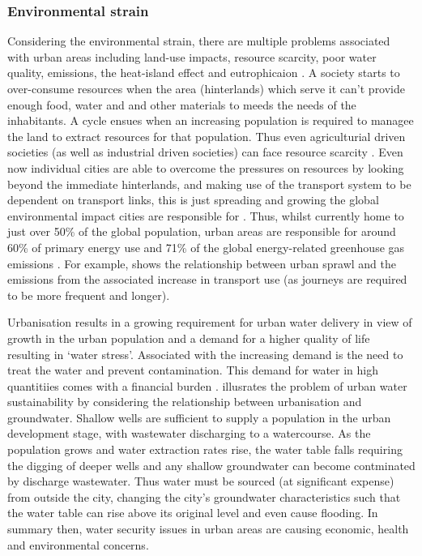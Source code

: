 \subsubsection{Environmental strain}
Considering the environmental strain, there are multiple problems associated with urban areas including land-use impacts, resource scarcity, poor water quality, emissions, the heat-island effect and eutrophicaion \citep{Cai2011}. A society starts to over-consume resources when the area (hinterlands) which serve it can't provide enough food, water and and other materials to meeds the needs of the inhabitants. A cycle ensues when an increasing population is required to managee the land to extract resources for that population. Thus even agriculturial driven societies (as well as industrial driven societies) can face resource scarcity \citep{Haberl2001a, Haberl2001b, Gr2003}. Even now individual cities are able to overcome the pressures on resources by looking beyond the immediate hinterlands, and making use of the transport system to be dependent on transport links, this is just spreading and growing the global environmental impact cities are responsible for \citep{Agudelo-Vera2011}. Thus, whilst currently home to just over 50\% of the global population, urban areas are responsible for around 60\% of primary energy use and 71\% of the global energy-related greenhouse gas emissions \citep{IEA2008}. For example, \citet{Grubler2009} shows the relationship between urban sprawl and the emissions from the associated increase in transport use (as journeys are required to be more frequent and longer).

Urbanisation results in a growing requirement for urban water delivery in view of growth in the urban population and a demand for a higher quality of life resulting in `water stress'. Associated with the increasing demand is the need to treat the water and prevent contamination. This demand for water in high quantitiies comes with a financial burden \citep{Diagger2009}. \citet{Kennedy} illusrates the problem of urban water sustainability by considering the relationship between urbanisation and groundwater. Shallow wells are sufficient to supply a population in the urban development stage, with wastewater discharging to a watercourse. As the population grows and water extraction rates rise, the water table falls requiring the digging of deeper wells and any shallow groundwater can become contminated by discharge wastewater. Thus water must be sourced (at significant expense) from outside the city, changing the city's groundwater characteristics such that the water table can rise above its original level and even cause flooding. In summary then, water security issues in urban areas are causing economic, health and environmental concerns.

